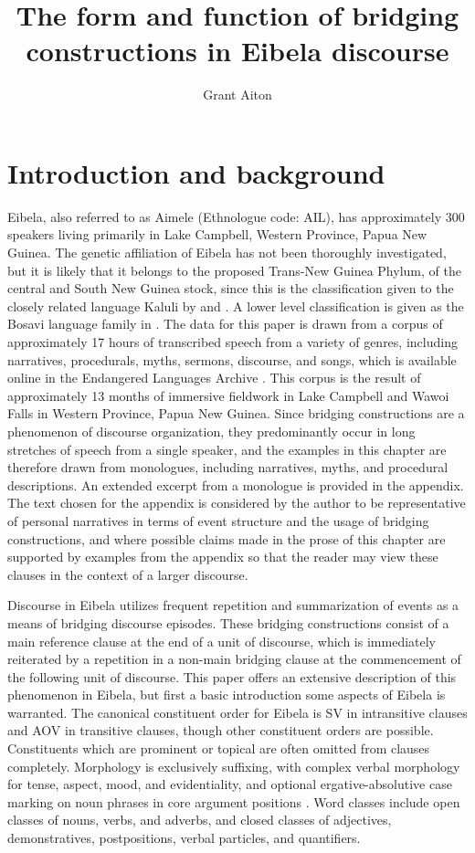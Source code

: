 \documentclass[output=paper]{LSP/langsci}
\author{
   Grant Aiton\affiliation{University of Alberta}
}
\title{The form and function of bridging constructions in Eibela discourse}
\begin{document}
\section{Introduction and background} 
\label{AiIntroduction}
Eibela, also referred to as Aimele (Ethnologue code: AIL), has approximately 300 speakers living primarily in Lake Campbell, Western Province, Papua New Guinea. The genetic affiliation of Eibela has not been thoroughly investigated, but it is likely that it belongs to the proposed Trans-New Guinea Phylum, of the central and South New Guinea stock, since this is the classification given to the closely related language Kaluli by \citet{wurm78} and \citet{voorhoeve68}. A lower level classification is given as the Bosavi language family in \citet{shaw86}. The data for this paper is drawn from a corpus of approximately 17 hours of transcribed speech from a variety of genres, including narratives, procedurals, myths, sermons, discourse, and songs, which is available online in the Endangered Languages Archive \citep{Aiton.2016}. This corpus is the result of approximately 13 months of immersive fieldwork in Lake Campbell and Wawoi Falls in Western Province, Papua New Guinea. Since bridging constructions are a phenomenon of discourse organization, they predominantly occur in long stretches of speech from a single speaker, and the examples in this chapter are therefore drawn from monologues, including narratives, myths, and procedural descriptions. An extended excerpt from a monologue is provided in the appendix. The text chosen for the appendix is considered by the author to be representative of personal narratives in terms of event structure and the usage of bridging constructions, and where possible claims made in the prose of this chapter are supported by examples from the appendix so that the reader may view these clauses in the context of a larger discourse.

Discourse in Eibela utilizes frequent repetition and summarization of events as a means of bridging discourse episodes. These bridging constructions consist of a main reference clause at the end of a unit of discourse, which is immediately reiterated by a repetition in a non-main bridging clause at the commencement of the following unit of discourse. This paper offers an extensive description of this phenomenon in Eibela, but first a basic introduction some aspects of Eibela is warranted. The canonical constituent order for Eibela is SV in intransitive clauses and AOV in transitive clauses, though other constituent orders are possible. Constituents which are prominent or topical are often omitted from clauses completely. Morphology is exclusively suffixing, with complex verbal morphology for tense, aspect, mood, and evidentiality, and optional ergative-absolutive case marking on noun phrases in core argument positions \citep[see][]{Aiton.2014}. Word classes include open classes of nouns, verbs, and adverbs, and closed classes of adjectives, demonstratives, postpositions, verbal particles, and quantifiers.
\end{document}
